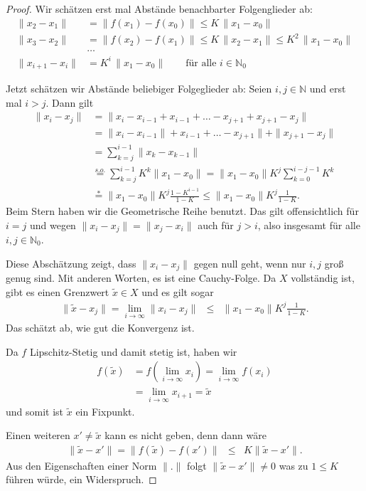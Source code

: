 \documentclass[index=totoc]{scrartcl}%
\theoremstyle{definition}
\newcommand{\N}{\mathbb N}
\begin{document}
\begin{proof}%
  Wir schätzen erst mal Abstände benachbarter Folgenglieder ab:
  \begin{align*}
    \|x_2-x_1\| &= \|f(x_1)-f(x_0)\|\le K\,\|x_1-x_0\| \\
    \|x_3-x_2\| &=  \|f(x_2)-f(x_1)\|\le K\,\|x_2-x_1\|\le K^2\,\|x_1-x_0\| \\
                & \dots\\
    \|x_{i+1}-x_i\| &=   K^i\,\|x_1-x_0\|\qquad\text{für alle }i\in\N_0
  \end{align*}

  Jetzt schätzen wir Abstände beliebiger Folgeglieder ab:
  Seien $i,j\in\N$ und erst mal $i>j$. Dann gilt
  \begin{align*}
    \|x_i-x_j\| &= \|x_i-x_{i-1}+x_{i-1}+\ldots -x_{j+1}+x_{j+1}-x_j\| \\
                &= \|x_i-x_{i-1}\|+x_{i-1}+\ldots -x_{j+1}\|+\|x_{j+1}-x_j\| \\
                &= \sum_{k=j}^{i-1}\|x_k-x_{k-1}\| \\
                &\overset{s.o.}= \sum_{k=j}^{i-1}K^k\|x_1-x_0\| 
                = \|x_1-x_0\|K^j\sum_{k=0}^{i-j-1}K^k \\
                &\overset*= \|x_1-x_0\|K^j\frac{1-K^{i-1}}{1-K} 
                \le \|x_1-x_0\|K^j\frac1{1-K}.
  \end{align*}
  Beim Stern haben wir die Geometrische Reihe benutzt. %
  Das gilt offensichtlich für $i=j$ und wegen $\|x_i-x_j\|=\|x_j-x_i\|$
  auch für $j>i$, also insgesamt für alle $i,j\in\N_0$.

  Diese Abschätzung zeigt, dass $\|x_i-x_j\|$ gegen null geht,
  wenn nur $i,j$ groß genug sind.
  Mit anderen Worten, es ist eine Cauchy-Folge.
  Da $X$ vollständig ist, gibt es einen Grenzwert $\tilde x\in X$
  und es gilt sogar
  \begin{eqnarray*}
    \|\tilde x-x_j\|=\lim_{i\to\infty}\|x_i-x_j\|
    &\le& \|x_1-x_0\|K^j\frac1{1-K}.
  \end{eqnarray*}
  Das schätzt ab, wie gut die Konvergenz ist.

  Da $f$ Lipschitz-Stetig und damit stetig ist, %
  haben wir
  \begin{align*}
    f(\tilde x) &=  f(\lim_{i\to\infty}x_i)=\lim_{i\to\infty}f(x_i) \\
                &= \lim_{i\to\infty}x_{i+1}=\tilde x
  \end{align*}
  und somit ist $\tilde x$ ein Fixpunkt.

  Einen weiteren $x'\not=\tilde x$ kann es nicht geben, denn dann wäre
  \begin{eqnarray*}
    \|\tilde x-x'\|=\|f(\tilde x)-f(x')\|&\le& K\|\tilde x-x'\|. 
  \end{eqnarray*}
  Aus den Eigenschaften einer Norm $\|.\|$ folgt $\|\tilde x-x'\|\not=0$
  was zu $1\le K$ führen würde, ein Widerspruch.
\end{proof}

\printindex
\end{document}
